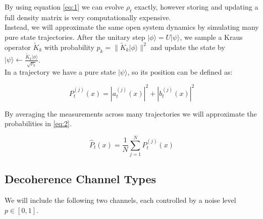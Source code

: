 \documentclass[11pt]{article}
\begin{document}
By using equation \eqref{eq:1} we can evolve $\rho_t$ exactly, however storing and updating a full density matrix is very computationally expensive.\\

\noindent Instead, we will approximate the same open system dynamics by simulating many pure state trajectories. After the unitary step $|\phi\rangle=U|\psi\rangle$, we sample a Kraus operator $\tilde K_k$ with probability $p_k = \|\tilde K_k|\phi\rangle\|^2$ and update the state by $|\psi\rangle \leftarrow \frac{\tilde K_k|\phi\rangle}{\sqrt{p_k}}$. \\

\noindent In a trajectory we have a pure state $|\psi\rangle$, so its position can be defined as:

\begin{equation}\label{eq:3}
P^{(j)}_t(x) = |a^{(j)}_t(x)|^2+|b^{(j)}_t(x)|^2
\end{equation}

\noindent By averaging the measurements across many trajectories we will approximate the probabilities in \eqref{eq:2}.

\begin{equation}\label{eq:4}\hat P_t(x) =\frac{1}{N}\sum^N_{j=1}P^{(j)}_t(x)
\end{equation}

\subsection*{Decoherence Channel Types}

We will include the following two channels, each controlled by a noise level $p\in[0,1]$.
\end{document}
